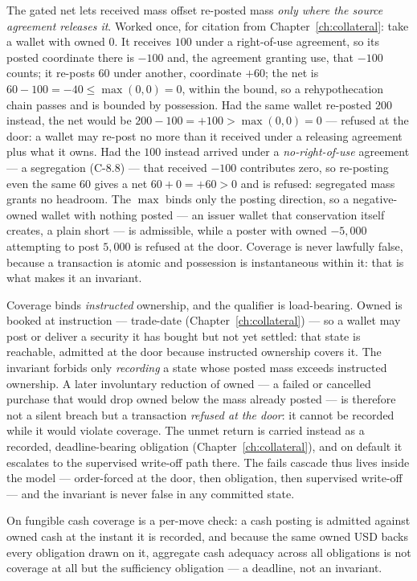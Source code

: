 \documentclass[11pt,a4paper]{article}
\begin{document}
The gated net lets received mass offset re-posted mass \emph{only where the source
agreement releases it}. Worked once, for citation from
Chapter~\ref{ch:collateral}: take a wallet with owned $0$. It receives $100$ under a
right-of-use agreement, so its posted coordinate there is $-100$ and, the agreement
granting use, that $-100$ counts; it re-posts $60$ under another, coordinate $+60$;
the net is $60-100=-40\le\max(0,0)=0$, within the bound, so a rehypothecation chain
passes and is bounded by possession. Had the same wallet re-posted $200$ instead, the
net would be $200-100=+100>\max(0,0)=0$ --- refused at the door: a wallet may re-post
no more than it received under a releasing agreement plus what it owns. Had the $100$
instead arrived under a \emph{no-right-of-use} agreement --- a segregation (C-8.8) ---
that received $-100$ contributes zero, so re-posting even the same $60$ gives a net
$60+0=+60>0$ and is refused: segregated mass grants no headroom. The $\max$ binds
only the posting direction, so a negative-owned wallet with nothing posted --- an
issuer wallet that conservation itself creates, a plain short --- is admissible,
while a poster with owned $-5{,}000$ attempting to post $5{,}000$ is refused at the
door. Coverage is never lawfully false, because a transaction is atomic and
possession is instantaneous within it: that is what makes it an invariant.

Coverage binds \emph{instructed} ownership, and the qualifier is load-bearing. Owned is
booked at instruction --- trade-date (Chapter~\ref{ch:collateral}) --- so a wallet may
post or deliver a security it has bought but not yet settled: that state is reachable,
admitted at the door because instructed ownership covers it. The invariant forbids only
\emph{recording} a state whose posted mass exceeds instructed ownership. A later
involuntary reduction of owned --- a failed or cancelled purchase that would drop owned
below the mass already posted --- is therefore not a silent breach but a transaction
\emph{refused at the door}: it cannot be recorded while it would violate coverage. The
unmet return is carried instead as a recorded, deadline-bearing obligation
(Chapter~\ref{ch:collateral}), and on default it escalates to the supervised write-off
path there. The fails cascade thus lives inside the model --- order-forced at the door,
then obligation, then supervised write-off --- and the invariant is never false in any
committed state.

On fungible cash coverage is a per-move check: a cash posting is admitted against owned
cash at the instant it is recorded, and because the same owned USD backs every
obligation drawn on it, aggregate cash adequacy across all obligations is not coverage
at all but the sufficiency obligation --- a deadline, not an invariant.
\end{document}
